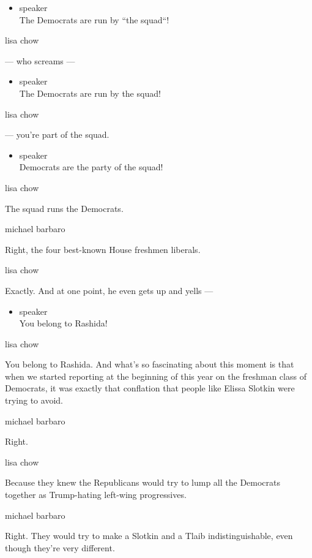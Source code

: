 \begin{itemize}
\tightlist
\item
  speaker\\
  The Democrats are run by ``the squad``!
\end{itemize}

lisa chow

--- who screams ---

\begin{itemize}
\tightlist
\item
  speaker\\
  The Democrats are run by the squad!
\end{itemize}

lisa chow

--- you're part of the squad.

\begin{itemize}
\tightlist
\item
  speaker\\
  Democrats are the party of the squad!
\end{itemize}

lisa chow

The squad runs the Democrats.

michael barbaro

Right, the four best-known House freshmen liberals.

lisa chow

Exactly. And at one point, he even gets up and yells ---

\begin{itemize}
\tightlist
\item
  speaker\\
  You belong to Rashida!
\end{itemize}

lisa chow

You belong to Rashida. And what's so fascinating about this moment is
that when we started reporting at the beginning of this year on the
freshman class of Democrats, it was exactly that conflation that people
like Elissa Slotkin were trying to avoid.

michael barbaro

Right.

lisa chow

Because they knew the Republicans would try to lump all the Democrats
together as Trump-hating left-wing progressives.

michael barbaro

Right. They would try to make a Slotkin and a Tlaib indistinguishable,
even though they're very different.


